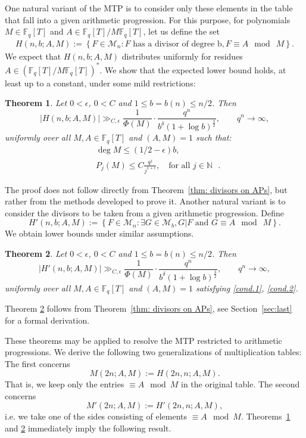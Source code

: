 \documentclass[12pt]{amsart}
\numberwithin{equation}{section}
\newtheorem{theorem}{Theorem}[section]
\theoremstyle{definition}
\theoremstyle{remark}
\newcommand{\FF}{\mathbb{F}}
\newcommand{\NN}{\mathbb{N}}
\begin{document}
    One natural variant of the MTP is to consider only these elements in the table that fall into a given arithmetic progression.
    For this purpose, for polynomials $M \in \mathbb{F}_q[T]$ and $A \in \mathbb{F}_q[T] / M\mathbb{F}_q[T]$, let us define the set
    \begin{align*}
        H(n,b;A,M) := \left\{F\in \mathcal{M}_n : F \mbox{ has a divisor of degree b}, F \equiv A \mod\ M\right\}.
    \end{align*}
    We expect that $H(n,b;A,M)$ distributes uniformly for residues $A\in (\FF_q[T]/M\FF_q[T])^*$. We show that the expected lower bound holds, at least up to a constant, under some mild restrictions:
    \begin{theorem}\label{thm:MTP on AP}
        Let $0 < \epsilon$, $0 < C$ and $1\leq b=b(n)\leq n/2$. Then
        \[
            |H(n,b;A,M)| \gg_{C,\epsilon} \frac{1}{\Phi(M)}\cdot \frac{q^n}{b^{\delta}(1+\log b)^{\frac32}}, \qquad q^n\to \infty,
        \]
        uniformly over all $M,A\in \FF_q[T]$ and $(A,M)=1$ such that:
        \begin{align}
             &\deg M \leq (1/2 - \epsilon) b , \label{cond.1}\\
              &P_j(M)\leq C \frac{q^j}{j^{1+\epsilon}}, \quad \mbox{for all $j\in\NN$ }. \label{cond.2}
        \end{align}
    \end{theorem}
    The proof does not follow directly from Theorem~\ref{thm: divisors on APs}, but rather from the methods developed to prove it. 
    Another natural variant is to consider the divisors to be taken from a given arithmetic progression. Define
    \[
         H'(n,b;A,M) := \left\{F\in \mathcal{M}_n : \exists G\in \mathcal{M}_b, G|F \mbox{ and }G \equiv A \mod\ M\right\}.
    \]
    We obtain lower bounds under similar assumptions.
    \begin{theorem}\label{thm:divisor on AP}
        Let $0 < \epsilon$, $0 < C$ and $1\leq b=b(n)\leq n/2$. Then 
        \[
            |H'(n,b;A,M)| \gg_{C,\epsilon} \frac{1}{\Phi(M)}\cdot \frac{q^n}{b^{\delta}(1+\log b)^{\frac32}}, \qquad q^n\to \infty,
        \]
        uniformly over all $M,A\in \FF_q[T]$ and $(A,M)=1$ satisfying \eqref{cond.1}, \eqref{cond.2}.
    \end{theorem}

    Theorem \ref{thm:divisor on AP} follows from Theorem~\ref{thm: divisors on APs}, see Section~\ref{sec:last} for a formal derivation.

     These theorems may be applied to resolve  the MTP restricted to arithmetic progressions. We derive the following two generalizations of multiplication tables: The first concerns 
    \[
        M(2n;A,M) := H(2n,n;A,M).
    \]
    That is, we keep only the entries $\equiv A\mod M$ in the  original table. The second concerns 
    \[
        M'(2n;A,M) := H'(2n,n; A,M),
    \]
    i.e. we take one of the sides consisting of elements $\equiv A\mod M$. Theorems~\ref{thm:MTP on AP} and \ref{thm:divisor on AP} immediately imply the following result.
    
\end{document}
